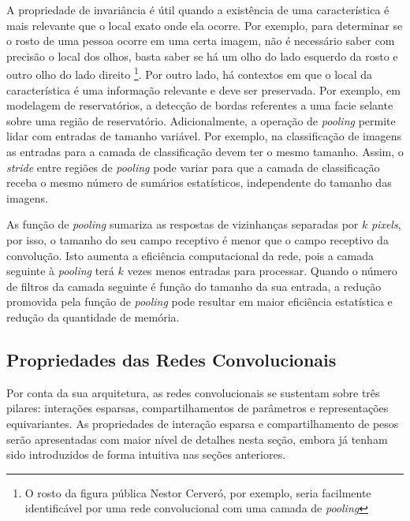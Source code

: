 A propriedade de invariância é útil quando a existência de uma característica é mais relevante que
o local exato onde ela ocorre. Por exemplo, para determinar se o rosto de uma pessoa ocorre em uma certa imagem, não é necessário saber
com precisão o local dos olhos, basta saber se há um olho do lado esquerdo da rosto e outro olho do lado direito
\footnote{O rosto da figura pública Nestor Cerveró, por exemplo, seria facilmente identificável por uma rede convolucional com uma camada de \textit{pooling}}.
Por outro lado, há contextos em que o local da característica é uma informação relevante e deve ser preservada. Por exemplo,
em modelagem de reservatórios, a detecção de bordas referentes a uma facie selante sobre uma região de reservatório.
Adicionalmente, a operação de \textit{pooling} permite lidar com entradas de tamanho variável. Por exemplo, na classificação de imagens
as entradas para a camada de classificação devem ter o mesmo tamanho. Assim, o \textit{stride} entre regiões de \textit{pooling} pode variar
para que a camada de classificação receba o mesmo número de sumários estatísticos, independente do tamanho das imagens.

As função de \textit{pooling} sumariza as respostas de vizinhanças separadas por $k$ \textit{pixels}, por isso, o tamanho do seu campo receptivo é menor
que o campo receptivo da convolução. Isto aumenta a eficiência computacional da rede, pois a camada seguinte à \textit{pooling} terá $k$ vezes
menos entradas para processar. Quando o número de filtros da camada seguinte é função do tamanho da sua entrada, a redução promovida pela
função de \textit{pooling} pode resultar em maior eficiência estatística e redução da quantidade de memória.

\subsection{Propriedades das Redes Convolucionais}
Por conta da sua arquitetura, as redes convolucionais se sustentam sobre três pilares: interações esparsas, compartilhamentos
de parâmetros e representações equivariantes. As propriedades de interação esparsa e compartilhamento de pesos serão apresentadas
com maior nível de detalhes nesta seção, embora já tenham sido introduzidos de forma intuitiva nas seções anteriores.

